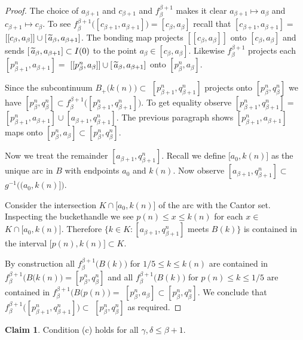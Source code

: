 \documentclass[12pt]{article}
\theoremstyle{plain}
\theoremstyle{definition}
\newcounter{ClaimCounter}
\newtheorem{claim}[ClaimCounter]{Claim}
\newcounter{claim5counter}
\newcommand{\B}{\ensuremath{\beta}}
\newcommand{\G}{\ensuremath{\gamma}}
\newcommand{\D}{\ensuremath{\delta}}
\newcommand{\0}{\ensuremath{\varnothing}}
\newcommand{\wt}{\ensuremath{\widetilde}}
\begin{document}
	
	\begin{proof}
		The choice of $a_{\B+1}$ and $c_{\B+1}$ and $f^{\B+1}_\B$ makes it clear $a_{\B+1} \mapsto a_\B$ and $c_{\B+1} \mapsto c_\B$.
		To see $f^{\B+1}_\B\big ( [c_{\B+1}, a_{\B+1}] \big ) = [c_{\B}, a_{\B}]$ recall that $[c_{\B+1}, a_{\B+1}] = $ 
		$[[c_{\B}, a_{\B} ]] \cup [ \, \wt a_{\B}, a_{\B+1}]$.
		The bonding map projects $[[c_\B,a_\B]]$ onto $[c_\B,a_\B]$ and sends $ [ \, \wt a_{\B}, a_{\B+1}] \subset I(0)$ to the point $a_\B \in [c_\B,a_\B]$.
		Likewise $f^{\B+1}_\B$ projects each $[p^n_{\B+1}, a_{\B+1}] = $ $[[p^n_{\B}, a_{\B}]] \cup  [ \, \wt a_{\B}, a_{\B+1}]$ onto $[p^n_{\B}, a_{\B}]$.
		
		
		Since the subcontinuum \mbox{$B_+ \big (k(n) \big ) \subset $} $[p^n_{\B+1},q^n_{\B+1}]$ projects 
		onto $[p^n_\B,q^n_\B]$ we have $[p^n_\B,q^n_\B] \subset f^{\B+1}_\B\big ( [p^n_{\B+1}, q^n_{\B+1}] \big )$.
		To get equality observe \mbox{$[p^n_{\B+1},q^n_{\B+1}] =$} $ [p^n_{\B+1},a_{\B+1}] \cup [a_{\B+1}, q^n_{\B+1}]$.
		The previous paragraph shows $[p^n_{\B+1},a_{\B+1}] $ maps onto $[p^n_{\B},a_{\B}] \subset [p^n_{\B},q^n_{\B}]$.
		
		Now we treat the remainder $[a_{\B+1}, q^n_{\B+1}]$.
		Recall we define $\big [a_0,k(n)\big ]$ as the unique arc in $B$ with endpoints $a_0$ and $k(n)$.
		Now observe $[a_{\B+1}, q^n_{\B+1}] \subset $ $g^{-1} \big (\big (a_0,k(n)\big ] \big )$.
		
		Consider the intersection $K \cap \big [a_0,k(n)\big ]$ of the arc with the Cantor set.
		Inspecting the buckethandle we see $p(n) \le x \le k(n)$ for each $x \in $ $K \cap \big [a_0,k(n)\big ]$.
		Therefore $\big \{k \in K: [a_{\B+1}, q^n_{\B+1}]$ meets $B(k) \big \}$ is contained in the interval $\big [p(n), k(n) \big ] \subset K$.
		
		By construction all $f^{\B+1}_\B \big (B(k) \big )$ for $1/5 \le k \le k(n)$ are contained in $f^{\B+1}_\B \big (B(k(n) \big ) = [p^n_\B,q^n_\B]$
		and all $f^{\B+1}_\B \big (B(k) \big )$ for $p(n) \le k \le 1/5$ 
		are contained in $f^{\B+1}_\B \big (B(p(n) \big ) = $ $[p^n_\B,a_\B] \subset [p^n_\B,q^n_\B]$.
		We conclude that $f^{\B+1}_\B\big ( [p^n_{\B+1}, q^n_{\B+1}] \big ) \subset  $ $[p^n_{\B}, q^n_{\B}]$ as required.
	\end{proof}
	
	\begin{claim}\label{LastSuccessor}
		Condition (c) holds for all $\G,\D \le \B+1$.
	\end{claim}
	
\end{document}
